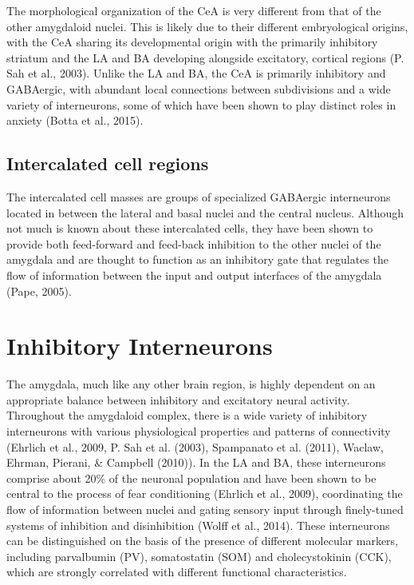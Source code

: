 \documentclass[12pt,a4paperpaper,]{report}
\begin{document}
The morphological organization of the CeA is very different from that of
the other amygdaloid nuclei. This is likely due to their different
embryological origins, with the CeA sharing its developmental origin
with the primarily inhibitory striatum and the LA and BA developing
alongside excitatory, cortical regions (P. Sah et al., 2003). Unlike the
LA and BA, the CeA is primarily inhibitory and GABAergic, with abundant
local connections between subdivisions and a wide variety of
interneurons, some of which have been shown to play distinct roles in
anxiety (Botta et al., 2015).

\subsection{Intercalated cell regions}\label{intercalated-cell-regions}

The intercalated cell masses are groups of specialized GABAergic
interneurons located in between the lateral and basal nuclei and the
central nucleus. Although not much is known about these intercalated
cells, they have been shown to provide both feed-forward and feed-back
inhibition to the other nuclei of the amygdala and are thought to
function as an inhibitory gate that regulates the flow of information
between the input and output interfaces of the amygdala (Pape, 2005).

\section{Inhibitory Interneurons}\label{inhibitory-interneurons}

The amygdala, much like any other brain region, is highly dependent on
an appropriate balance between inhibitory and excitatory neural
activity. Throughout the amygdaloid complex, there is a wide variety of
inhibitory interneurons with various physiological properties and
patterns of connectivity (Ehrlich et al., 2009, P. Sah et al. (2003),
Spampanato et al. (2011), Waclaw, Ehrman, Pierani, \& Campbell (2010)).
In the LA and BA, these interneurons comprise about 20\% of the neuronal
population and have been shown to be central to the process of fear
conditioning (Ehrlich et al., 2009), coordinating the flow of
information between nuclei and gating sensory input through finely-tuned
systems of inhibition and disinhibition (Wolff et al., 2014). These
interneurons can be distinguished on the basis of the presence of
different molecular markers, including parvalbumin (PV), somatostatin
(SOM) and cholecystokinin (CCK), which are strongly correlated with
different functional characteristics.
\end{document}
